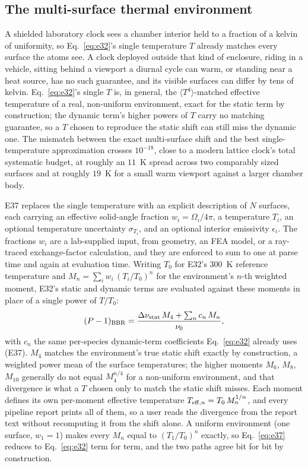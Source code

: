 \documentclass[aps,pra,superscriptaddress,groupedaddress,nofootinbib]{revtex4-2}
\begin{document}
\subsection{The multi-surface thermal environment}
\label{sec:bbr-environment}

A shielded laboratory clock sees a chamber interior held to a fraction of a
kelvin of uniformity, so Eq.~\eqref{eq:e32}'s single temperature $T$ already
matches every surface the atoms see. A clock deployed outside that kind of
enclosure, riding in a vehicle, sitting behind a viewport a diurnal cycle can
warm, or standing near a heat source, has no such guarantee, and its visible
surfaces can differ by tens of kelvin. Eq.~\eqref{eq:e32}'s single $T$ is, in
general, the $\langle T^4\rangle$-matched effective temperature of a real,
non-uniform environment, exact for the static term by construction; the
dynamic term's higher powers of $T$ carry no matching guarantee, so a $T$
chosen to reproduce the static shift can still miss the dynamic one. The
mismatch between the exact multi-surface shift and the best
single-temperature approximation crosses $10^{-18}$, close to a modern
lattice clock's total systematic budget, at roughly an $11$~K spread across
two comparably sized surfaces and at roughly $19$~K for a small warm
viewport against a larger chamber body.

E37 replaces the single temperature with an explicit description of $N$
surfaces, each carrying an effective solid-angle fraction $w_i=\Omega_i/4\pi$,
a temperature $T_i$, an optional temperature uncertainty $\sigma_{T_i}$, and
an optional interior emissivity $\epsilon_i$. The fractions $w_i$ are a
lab-supplied input, from geometry, an FEA model, or a ray-traced
exchange-factor calculation, and they are enforced to sum to one at parse
time and again at evaluation time. Writing $T_0$ for E32's $300$~K reference
temperature and $M_n=\sum_i w_i\,(T_i/T_0)^n$ for the environment's $n$-th
weighted moment, E32's static and dynamic terms are evaluated against these
moments in place of a single power of $T/T_0$:
\begin{equation}
  (P-1)_{\rm BBR} = \frac{\Delta\nu_{\rm stat}\,M_4 + \sum_n c_n\,M_n}{\nu_0} ,
  \label{eq:e37}
\end{equation}
with $c_n$ the same per-species dynamic-term coefficients Eq.~\eqref{eq:e32}
already uses (E37). $M_4$ matches the environment's true static shift
exactly by construction, a weighted power mean of the surface temperatures;
the higher moments $M_6$, $M_8$, $M_{10}$ generally do not equal
$M_4^{n/4}$ for a non-uniform environment, and that divergence is what a $T$
chosen only to match the static shift misses. Each moment defines its own
per-moment effective temperature $T_{{\rm eff},n}=T_0\,M_n^{1/n}$, and every
pipeline report prints all of them, so a user reads the divergence from the
report text without recomputing it from the shift alone. A uniform
environment (one surface, $w_1=1$) makes every $M_n$ equal to $(T_1/T_0)^n$
exactly, so Eq.~\eqref{eq:e37} reduces to Eq.~\eqref{eq:e32} term for term,
and the two paths agree bit for bit by construction.
\end{document}
